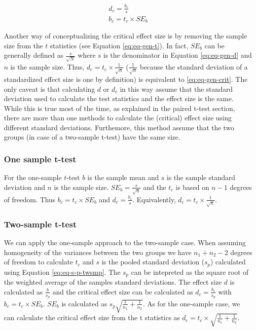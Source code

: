 \documentclass[
  man]{apa7}
\begin{document}
\begin{equation}
\begin{gathered}
    \label{eq:eq-gen-crit}
    d_c = \frac{b_c}{s} \\
    b_c = t_c \times SE_b
\end{gathered}
\end{equation}

Another way of conceptualizing the critical effect size is by removing the sample size from the \(t\) statistics (see Equation \eqref{eq:eq-gen-t}). In fact, \(SE_b\) can be generally defined as \(\frac{s}{\sqrt{N}}\) where \(s\) is the denominator in Equation \eqref{eq:eq-gen-d} and \(n\) is the sample size. Thus, \(d_c = t_c \times \frac{1}{\sqrt{n}}\) (\(\frac{1}{\sqrt{n}}\) because the standard deviation of a standardized effect size is one by definition) is equivalent to \eqref{eq:eq-gen-crit}. The only caveat is that calculating \(d\) or \(d_c\) in this way assume that the standard deviation used to calculate the test statistics and the effect size is the same. While this is true most of the time, as explained in the paired t-test section, there are more than one methods to calculate the (critical) effect size using different standard deviations. Furthemore, this method assume that the two groups (in case of a two-sample t-test) have the same size.

\hypertarget{one-sample-t-test}{%
\subsubsection{One sample t-test}\label{one-sample-t-test}}

For the one-sample \(t\)-test \(b\) is the sample mean and \(s\) is the sample standard deviation and \(n\) is the sample size. \(SE_b = \frac{s}{\sqrt{n}}\) and the \(t_c\) is based on \(n - 1\) degrees of freedom. Thus \(b_c = t_c \times SE_b\) and \(d_c = \frac{b_c}{s}\). Equivalently, \(d_c = t_c \times \frac{1}{\sqrt{n}}\).

\hypertarget{two-sample-t-test}{%
\subsubsection{Two-sample t-test}\label{two-sample-t-test}}

We can apply the one-sample approach to the two-sample case. When assuming homogeneity of the variances between the two groups we have \(n_1 + n_2 - 2\) degrees of freedom to calculate \(t_c\) and \(s\) is the pooled standard deviation (\(s_p\)) calculated using Equation \eqref{eq:eq-s-p-twsmp}. The \(s_p\) can be intepreted as the square root of the weighted average of the samples standard deviations. The effect size \(d\) is calculated as \(\frac{b}{s_p}\) and the critical effect size can be calculated as \(d_c = \frac{b_c}{s_p}\) with \(b_c = t_c \times SE_b\). \(SE_b\) is calculated as \(s_p \sqrt{\frac{1}{n_1} + \frac{1}{n_2}}\). As for the one-sample case, we can calculate the critical effect size from the t statistics as \(d_c = t_c \times \sqrt{\frac{1}{n_1} + \frac{1}{n_2}}\).
\end{document}
